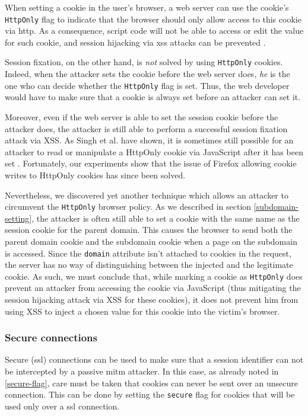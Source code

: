 When setting a cookie in the user's browser, a web server can use the cookie's \texttt{HttpOnly} flag to indicate that the browser should only allow access to this cookie via \gls{http}. As a consequence, script code will not be able to access or edit the value for such cookie, and session hijacking via \gls{xss} attacks can be prevented \cite{HttpOnly}.

Session fixation, on the other hand, is \emph{not} solved by using \texttt{HttpOnly} cookies. Indeed, when the attacker sets the cookie before the web server does, \emph{he} is the one who can decide whether the \texttt{HttpOnly} flag is set. Thus, the web developer would have to make sure that a cookie is always set before an attacker can set it.

Moreover, even if the web server is able to set the session cookie before the attacker does, the attacker is still able to perform a successful session fixation attack via XSS. As Singh et al. have shown, it is sometimes still possible for an attacker to read or manipulate a HttpOnly cookie via JavaScript after it has been set \cite{Singh2010}. Fortunately, our experiments show that the issue of Firefox allowing cookie writes to HttpOnly cookies has since been solved.

Nevertheless, we discovered yet another technique which allows an attacker to circumvent the \texttt{HttpOnly} browser policy. As we described in section \ref{subdomain-setting}, the attacker is often still able to set a cookie with the same name as the session cookie for the parent domain. This causes the browser to send both the parent domain cookie and the subdomain cookie when a page on the subdomain is accessed. Since the \texttt{domain} attribute isn't attached to cookies in the request, the server has no way of distinguishing between the injected and the legitimate cookie. As such, we must conclude that, while marking a cookie as \texttt{HttpOnly} does prevent an attacker from accessing the cookie via JavaScript (thus mitigating the session hijacking attack via XSS for these cookies), it does not prevent him from using XSS to inject a chosen value for this cookie into the victim's browser.

\subsubsection{Secure connections}\label{ssl}

Secure (\gls{ssl}) connections \cite{Stallings2011} can be used to make sure that a session identifier can not be intercepted by a passive \gls{mitm} attacker. In this case, as already noted in \ref{secure-flag}, care must be taken that cookies can never be sent over an unsecure connection. This can be done by setting the \texttt{secure} flag for cookies that will be used only over a \gls{ssl} connection.


